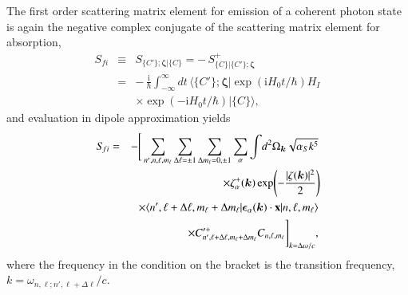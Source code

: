 \documentclass[final,3p,12pt]{elsarticle3}
\begin{document}
The first order scattering matrix element for emission of a coherent photon 
state is again the negative complex conjugate of the 
scattering matrix element for absorption,
\begin{eqnarray}\nonumber
S_{\!fi}&\equiv& S_{\{C'\};\bm{\zeta}|\{C\}}=-\,S^+_{\{C\}|\{C'\};\bm{\zeta}}
\\ \nonumber
&=&-\,\frac{\mathrm{i}}{\hbar}\int_{-\infty}^\infty\!dt\,\bm{\langle}
\{C'\};\bm{\zeta}\bm{|}
\exp(\mathrm{i}H_0t/\hbar) H_I
\\ \label{eq:linec1}
&&\times\exp(-\mathrm{i}H_0t/\hbar)
\bm{|}\{C\}\bm{\rangle},
\end{eqnarray}
and evaluation in dipole approximation yields 
\begin{eqnarray}\nonumber
S_{\!fi}&=&-\Bigg[\sum_{n',n,\ell,m_\ell}\sum_{\Delta\ell=\pm 1}\sum_{\Delta m_\ell=0,\pm 1}
\sum_\alpha\int\!d^2\Omega_{\bm{k}} \sqrt{\alpha_S k^5}
\\ \nonumber
&&\times
\zeta^+_\alpha(\bm{k})
\exp\!\left(-\frac{|\zeta(\bm{k})|^2}{2}\right)\!
\\ \nonumber
&&\times
\langle n',\ell+\Delta\ell,m_\ell+\Delta m_\ell|
\bm{\epsilon}_\alpha(\bm{k})\cdot\mathrm{\bf x}|n,\ell,m_\ell\rangle
\\ \label{eq:linec3}
&&\times
C'^+_{n',\ell+\Delta\ell,m_\ell+\Delta m_\ell}C_{n,\ell,m_\ell}\Bigg]_{k=\Delta\omega/c},
\end{eqnarray}
where the frequency in the condition on the bracket is the
transition frequency, $k=\omega_{n,\ell;n',\ell+\Delta\ell}/c$.
\end{document}
